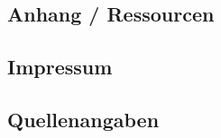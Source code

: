 \begin{appendix} %
\section{Anhang / Ressourcen}

\subsection{Impressum}



\subsection{Quellenangaben}



\end{appendix}
